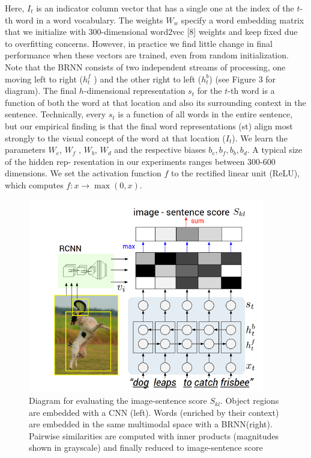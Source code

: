 \documentclass[12pt]{article}%
\begin{document}
Here, $I_t$ is an indicator column vector that has a single one at the index of the $t$-th word in a word vocabulary. The weights $W_w$ specify a word embedding matrix that we initialize with 300-dimensional word2vec [8] weights and keep fixed due to overfitting concerns. However, in practice we find little change in final performance when these vectors are trained, even from random initialization. Note that the BRNN consists of two independent streams of processing, one moving left to right ($ h_{t}^{f}$ ) and the other right to left ($h_{t}^{b}$) (see Figure 3 for diagram). The final $h$-dimensional representation $s_t$ for the $t$-th word is a function of both the word at that location and also its surrounding context in the sentence. Technically, every $s_t$ is a function of all words in the entire sentence, but our empirical finding is that the final word representations (st) align most strongly to the visual concept of the word at that location ($I_t$).
We learn the parameters $W_e$, $W_f$ , $W_b$, $W_d$ and the respective biases $b_e, b_f , b_b, b_d$.  A typical size of the hidden rep- resentation in our experiments ranges between 300-600 dimensions. We set the activation function $f$ to the rectified
linear unit (ReLU), which computes $f:x\to \max (0,x)$.

\begin{figure}[t]
\begin{center}
   \includegraphics[width=0.8\linewidth]{3.png}
\end{center}
   \caption{Diagram for evaluating the image-sentence score $S_{kl}$. Object regions are embedded with a CNN (left). Words (enriched by their context) are embedded in the same multimodal space with a BRNN(right). Pairwise similarities are computed with inner products (magnitudes shown in grayscale) and finally reduced to image-sentence score}
\label{fig:circle}
\end{figure}
\end{document}

